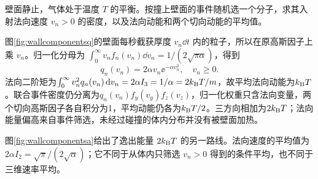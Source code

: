 \begin{example}[撞壁样本的法向与切向能量]
壁面静止，气体处于温度 $T$ 的平衡。按撞上壁面的事件随机选一个分子，求其入射法向速度 $v_n>0$ 的密度，以及法向动能和两个切向动能的平均值。
\end{example}
\begin{solution}
图\ref{fig:wallcomponentsq}的壁面每秒截获厚度 $v_n\dd t$ 内的粒子，所以在原高斯因子上乘 $v_n$。归一化分母为 $\int_0^\infty v_nf_n(v_n)\dd v_n=1/(2\sqrt{\pi\alpha})$，得到
\[
 q_n(v_n)=2\alpha v_n\ee^{-\alpha v_n^2},\quad v_n\ge0.
\]
法向二阶矩为$\int_0^\infty v_n^2q_n(v_n)\mathop{}\!\mathrm d v_n=2\alpha I_3=1/\alpha=2k_{\mathrm B} T/m$，故平均法向动能为$k_{\mathrm B} T$。联合事件密度仍分离为$q_n(v_n)f_y(v_y)f_z(v_z)$，归一化权重只含法向变量，两个切向高斯因子各自积分为1，平均动能仍各为$k_{\mathrm B} T/2$。三方向相加为$2k_{\mathrm B} T$；法向能量偏高来自事件筛选，未经过碰撞的体内分布并没有被壁面加热。

图\ref{fig:wallcomponentsa}给出了逸出能量 $2k_{\mathrm B} T$ 的另一路线。法向速度的平均值为 $2\alpha I_2=\sqrt\pi/(2\sqrt\alpha)$；它不同于从体内只筛选 $v_n>0$ 得到的条件平均，也不同于三维速率平均。
\end{solution}

